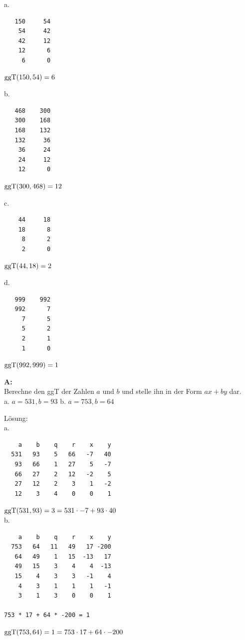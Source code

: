 \documentclass[landscape,twocolumn,a4paper]{article}
\begin{document}
\begin{minipage}[t]{4cm}
a.
\begin{lstlisting}
   150     54
    54     42
    42     12
    12      6
     6      0
\end{lstlisting}
$\operatorname{ggT}(150,54) = 6$ 
\end{minipage}
\begin{minipage}[t]{4cm}
b.
\begin{lstlisting}
   468    300
   300    168
   168    132
   132     36
    36     24
    24     12
    12      0
\end{lstlisting}
$\operatorname{ggT}(300,468) = 12$ 
\end{minipage}
\begin{minipage}[t]{4cm}
c.
\begin{lstlisting}
    44     18
    18      8
     8      2
     2      0
\end{lstlisting}
$\operatorname{ggT}(44,18) = 2$ 
\end{minipage}
\begin{minipage}[t]{4cm}
d.
\begin{lstlisting}
   999    992
   992      7
     7      5
     5      2
     2      1
     1      0
\end{lstlisting}
$\operatorname{ggT}(992,999) = 1$ 
\end{minipage}


 
\textbf{A:}   \\
Berechne den ggT der Zahlen $a$ und $b$ und stelle ihn in der Form $ax + by$ dar. \\
a.   $ a = 531, b = 93$  \quad b. $ a = 753, b = 64$
\bigskip {}

Lösung: \\
a. 
\begin{lstlisting}
    a    b    q    r    x    y
  531   93    5   66   -7   40
   93   66    1   27    5   -7
   66   27    2   12   -2    5
   27   12    2    3    1   -2
   12    3    4    0    0    1
\end{lstlisting}
$\operatorname{ggT}(531,93) = 3 = 531 \cdot  -7 + 93  \cdot 40$ \\

b. 
\begin{lstlisting}
    a    b    q    r    x    y
  753   64   11   49   17 -200
   64   49    1   15  -13   17
   49   15    3    4    4  -13
   15    4    3    3   -1    4
    4    3    1    1    1   -1
    3    1    3    0    0    1

753 * 17 + 64 * -200 = 1
\end{lstlisting}
$\operatorname{ggT}(753,64) = 1  =753 \cdot 17 + 64 \cdot -200$ \\
 
\end{document}
